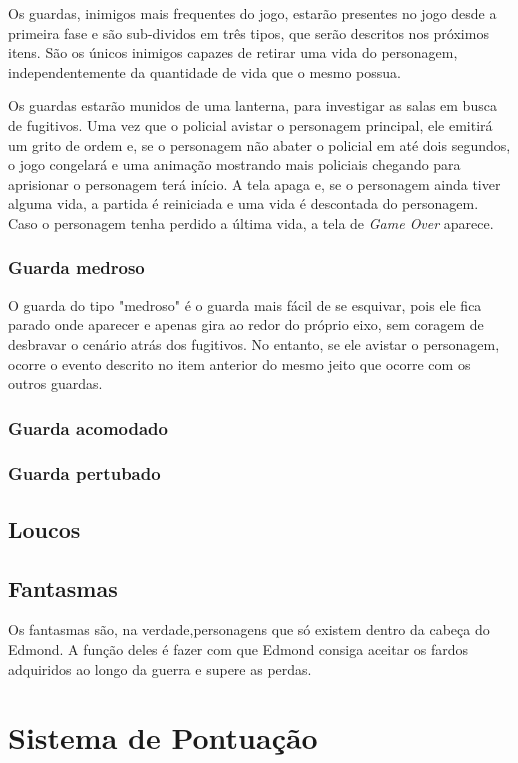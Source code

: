 \documentclass{article}
\begin{document}
Os guardas, inimigos mais frequentes do jogo, estarão presentes no jogo desde a primeira fase e são sub-dividos em três tipos, que serão descritos nos próximos itens. São os únicos inimigos capazes de retirar uma vida do personagem, independentemente da quantidade de vida que o mesmo possua.

Os guardas estarão munidos de uma lanterna, para investigar as salas em busca de fugitivos. Uma vez que o policial avistar o personagem principal, ele emitirá um grito de ordem e, se o personagem não abater o policial em até dois segundos, o jogo congelará e uma animação mostrando mais policiais chegando para aprisionar o personagem terá início. A tela apaga e, se o personagem ainda tiver alguma vida, a partida é reiniciada e uma vida é descontada do personagem. Caso o personagem tenha perdido a última vida, a tela de \textit{Game Over} aparece.

\subsubsection{Guarda medroso}

O guarda do tipo "medroso" é o guarda mais fácil de se esquivar, pois ele fica parado onde aparecer e apenas gira ao redor do próprio eixo, sem coragem de desbravar o cenário atrás dos fugitivos. No entanto, se ele avistar o personagem, ocorre o evento descrito no item anterior do mesmo jeito que ocorre com os outros guardas.

\subsubsection{Guarda acomodado}

\subsubsection{Guarda pertubado}
\subsection{Loucos}
\subsection{Fantasmas}

Os fantasmas são, na verdade,personagens que só existem dentro da cabeça do Edmond. A função deles é fazer com que Edmond consiga aceitar os fardos adquiridos ao longo da guerra e supere as perdas.

\section{Sistema de Pontuação}
\end{document}
